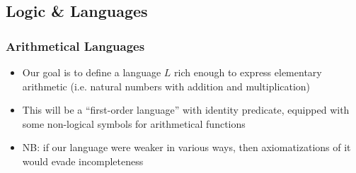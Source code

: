 \subsection{Logic \& Languages}

\begin{frame}
\frametitle{Arithmetical Languages}

\begin{itemize}[<+->]

\item Our goal is to define a language $L$ rich enough to express elementary arithmetic (i.e. natural numbers with addition and multiplication)

\item This will be a ``first-order language'' with identity predicate, equipped with some non-logical symbols for arithmetical functions 

\item NB: if our language were weaker in various ways, then axiomatizations of it would evade incompleteness 

\end{itemize}
\end{frame}

